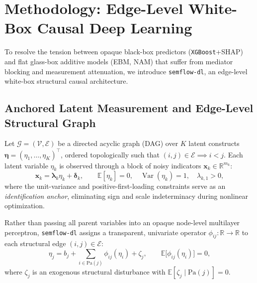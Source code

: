\section{Methodology: Edge-Level White-Box Causal Deep Learning}
\label{sec:methodology}

To resolve the tension between opaque black-box predictors (\texttt{XGBoost}+SHAP) and flat glass-box additive models (EBM, NAM) that suffer from mediator blocking and measurement attenuation, we introduce \texttt{semflow-dl}, an edge-level white-box structural causal architecture.

\subsection{Anchored Latent Measurement and Edge-Level Structural Graph}
Let $\mathcal{G} = (\mathcal{V}, \mathcal{E})$ be a directed acyclic graph (DAG) over $K$ latent constructs $\boldsymbol{\eta} = (\eta_1, \dots, \eta_K)^\top$, ordered topologically such that $(i, j) \in \mathcal{E} \implies i < j$. Each latent variable $\eta_k$ is observed through a block of noisy indicators $\mathbf{x}_k \in \mathbb{R}^{m_k}$:
\begin{equation}
  \mathbf{x}_k = \boldsymbol{\lambda}_k \eta_k + \boldsymbol{\delta}_k,
  \qquad \mathbb{E}[\eta_k] = 0, \quad \operatorname{Var}(\eta_k) = 1, \quad \lambda_{k,1} > 0,
  \label{eq:anchored-measurement}
\end{equation}
where the unit-variance and positive-first-loading constraints serve as an \emph{identification anchor}, eliminating sign and scale indeterminacy during nonlinear optimization.

Rather than passing all parent variables into an opaque node-level multilayer perceptron, \texttt{semflow-dl} assigns a transparent, univariate operator $\phi_{ij}: \mathbb{R} \to \mathbb{R}$ to each structural edge $(i, j) \in \mathcal{E}$:
\begin{equation}
  \eta_j = b_j + \sum_{i \in \mathrm{Pa}(j)} \phi_{ij}(\eta_i) + \zeta_j,
  \qquad \mathbb{E}\big[\phi_{ij}(\eta_i)\big] = 0,
  \label{eq:edge-structural}
\end{equation}
where $\zeta_j$ is an exogenous structural disturbance with $\mathbb{E}[\zeta_j \mid \mathrm{Pa}(j)] = 0$.

